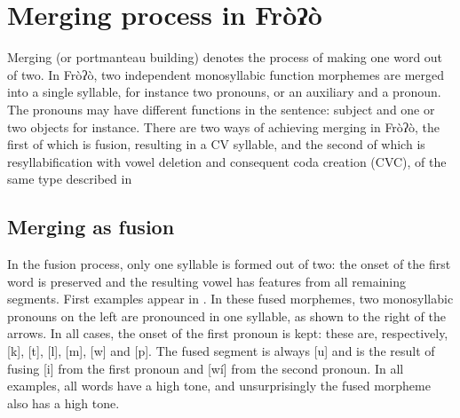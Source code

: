 \documentclass[output=paper]{langscibook}
\begin{document}
\section{Merging process in Fròʔò} 
\label{sec:traore:merging_process:4}

Merging (or portmanteau building) denotes the process of making one word out of two. In Fròʔò, two independent monosyllabic function morphemes are merged into a single syllable, for instance two pronouns, or an auxiliary and a pronoun. The pronouns may have different functions in the sentence: subject and one or two objects for instance. There are two ways of achieving merging in Fròʔò, the first of which is fusion, resulting in a CV syllable, and the second of which is resyllabification with vowel deletion and consequent coda creation (CVC), of the same type described in 

\subsection{Merging as fusion}
\label{sec:traore:merging_as_fusion:4a}

In the fusion process, only one syllable is formed out of two: the onset of the first word is preserved and the resulting vowel has features from all remaining segments. First examples appear in . In these fused morphemes, two monosyllabic pronouns on the left are pronounced in one syllable, as shown to the right of the arrows. In all cases, the onset of the first pronoun is kept: these are, respectively, [k], [t], [l], [m], [w] and [p]. The fused segment is always [u] and is the result of fusing [i] from the first pronoun and [wí] from the second pronoun. In all examples, all words have a high tone, and unsurprisingly the fused morpheme also has a high tone.
    
\end{document}

